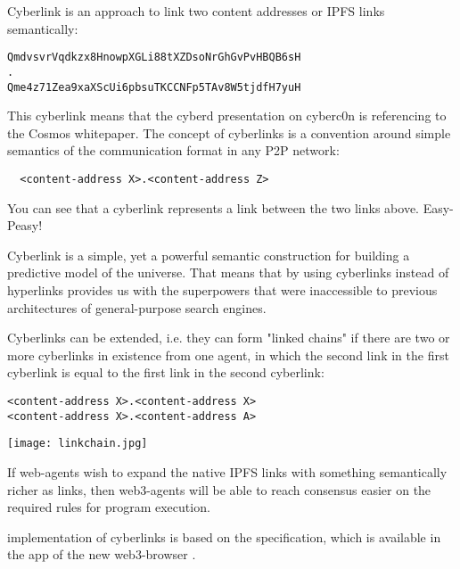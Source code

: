 \documentclass[8pt,oneside]{amsart}
\newcommand{\linkred}[2]{\href{#1}{\color{red}{#2}}}
\newcommand{\code}[1]{{\PlayBold #1}}
\newenvironment{Figure}
  {\par\medskip\noindent\minipage{\linewidth}}
  {\endminipage\par\medskip}
\begin{document}
\begin{Abstract}
\code{Cyberlink} is an approach to link two content addresses or \code{IPFS links} semantically:

\begin{lstlisting}
QmdvsvrVqdkzx8HnowpXGLi88tXZDsoNrGhGvPvHBQB6sH
.
Qme4z71Zea9xaXScUi6pbsuTKCCNFp5TAv8W5tjdfH7yuH
\end{lstlisting}

This cyberlink means that the cyberd presentation on cyberc0n is referencing to the Cosmos whitepaper. The concept of cyberlinks is a convention around simple semantics of the communication format in any P2P network:

\begin{lstlisting}
  <content-address X>.<content-address Z>
\end{lstlisting}

You can see that a cyberlink represents a link between the two links above. Easy-Peasy!

Cyberlink is a simple, yet a powerful semantic construction for building a predictive model of the universe. That means that by using cyberlinks instead of hyperlinks provides us with the superpowers that were inaccessible to previous architectures of general-purpose search engines.

Cyberlinks can be extended, i.e. they can form "linked chains" if there are two or more cyberlinks in existence from one agent, in which the second link in the first cyberlink is equal to the first link in the second cyberlink:

\begin{lstlisting}
<content-address X>.<content-address X>
<content-address X>.<content-address A>
\end{lstlisting}

\begin{Figure}
    \centering
    \texttt{[image: linkchain.jpg]}
\end{Figure}

If web-agents wish to expand the native \code{IPFS links} with something semantically richer as
\linkred{https://github.com/cybercongress/cyb/blob/dev/docs/dura.md}{DURA}
links, then web3-agents will be able to reach consensus easier on the required rules for program execution.

\linkred{https://github.com/cybercongress/cyberd}{cyber} implementation of \code{cyberlinks} is based on the \linkred{https://github.com/cybercongress/cyb/blob/dev/docs/dura.md}{DURA} specification, which is available in the \linkred{https://github.com/cybercongress/.cyber}{.cyber} app of the new web3-browser \linkred{https://github.com/cybercongress/cyb}{cyb}.


\end{Abstract}
\end{document}
